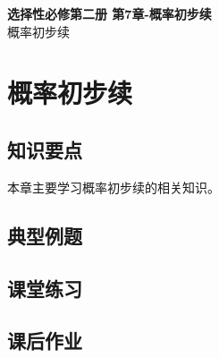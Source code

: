 \documentclass[12pt,a4paper]{article}
\begin{document}
\begin{center}
\LARGE\textbf{选择性必修第二册 第7章-概率初步续} \\[0.5em]
\large 概率初步续
\end{center}

\tableofcontents
\newpage

\section{概率初步续}

\subsection{知识要点}
本章主要学习概率初步续的相关知识。

\subsection{典型例题}

\subsection{课堂练习}

\subsection{课后作业}
\end{document}
